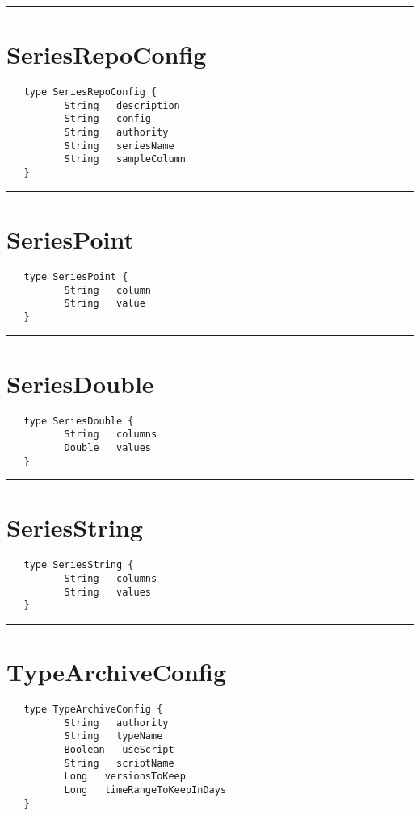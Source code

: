 \rule{15cm}{2pt}
\section{SeriesRepoConfig}
\label{type:SeriesRepoConfig}

\begin{verbatim}
   type SeriesRepoConfig {
          String   description
          String   config
          String   authority
          String   seriesName
          String   sampleColumn
   }
\end{verbatim}

\rule{15cm}{2pt}
\section{SeriesPoint}
\label{type:SeriesPoint}

\begin{verbatim}
   type SeriesPoint {
          String   column
          String   value
   }
\end{verbatim}

\rule{15cm}{2pt}
\section{SeriesDouble}
\label{type:SeriesDouble}

\begin{verbatim}
   type SeriesDouble {
          String   columns
          Double   values
   }
\end{verbatim}

\rule{15cm}{2pt}
\section{SeriesString}
\label{type:SeriesString}

\begin{verbatim}
   type SeriesString {
          String   columns
          String   values
   }
\end{verbatim}

\rule{15cm}{2pt}
\section{TypeArchiveConfig}
\label{type:TypeArchiveConfig}

\begin{verbatim}
   type TypeArchiveConfig {
          String   authority
          String   typeName
          Boolean   useScript
          String   scriptName
          Long   versionsToKeep
          Long   timeRangeToKeepInDays
   }
\end{verbatim}

